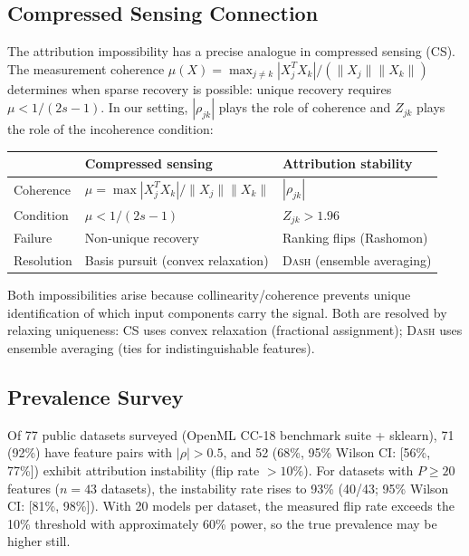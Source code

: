 \documentclass{jmlr}
\newcommand{\DASH}{\textsc{Dash}}
\begin{document}
\subsection{Compressed Sensing Connection}

The attribution impossibility has a precise analogue in compressed sensing (CS). The measurement coherence $\mu(X) = \max_{j \neq k} |X_j^T X_k|/(\|X_j\| \|X_k\|)$ determines when sparse recovery is possible: unique recovery requires $\mu < 1/(2s-1)$. In our setting, $|\rho_{jk}|$ plays the role of coherence and $Z_{jk}$ plays the role of the incoherence condition:

\begin{center}
\small
\begin{tabular}{@{}lll@{}}
\toprule
& \textbf{Compressed sensing} & \textbf{Attribution stability} \\
\midrule
Coherence & $\mu = \max |X_j^T X_k|/\|X_j\|\|X_k\|$ & $|\rho_{jk}|$ \\
Condition & $\mu < 1/(2s{-}1)$ & $Z_{jk} > 1.96$ \\
Failure & Non-unique recovery & Ranking flips (Rashomon) \\
Resolution & Basis pursuit (convex relaxation) & \DASH{} (ensemble averaging) \\
\bottomrule
\end{tabular}
\end{center}

Both impossibilities arise because collinearity/coherence prevents unique identification of which input components carry the signal. Both are resolved by relaxing uniqueness: CS uses convex relaxation (fractional assignment); \DASH{} uses ensemble averaging (ties for indistinguishable features).

\subsection{Prevalence Survey}
\label{sec:prevalence}

Of 77 public datasets surveyed (OpenML CC-18 benchmark suite + sklearn), 71 (92\%) have feature pairs with $|\rho| > 0.5$, and 52 (68\%, 95\% Wilson CI: [56\%, 77\%]) exhibit attribution instability (flip rate $> 10\%$). For datasets with $P \geq 20$ features ($n = 43$ datasets), the instability rate rises to 93\% (40/43; 95\% Wilson CI: [81\%, 98\%]). With 20 models per dataset, the measured flip rate exceeds the 10\% threshold with approximately 60\% power, so the true prevalence may be higher still.
\end{document}
